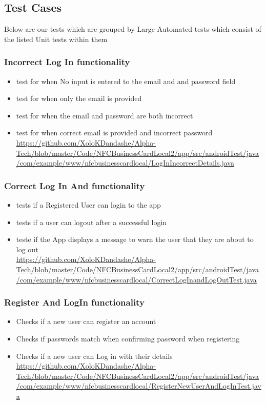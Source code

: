 \documentclass[english]{article}
\begin{document}
	\subsection {Test Cases}
	Below are our tests which are grouped by Large Automated tests which consist of the listed Unit tests within them
		\subsubsection{Incorrect Log In functionality}
		\begin{itemize} 
			\item test for when No input is entered to the email and and password field
			\item test for when only the email is provided 
			\item test for when the email and password  are both incorrect
			\item test for when correct email is provided and incorrect password
			\\
			\href{url}{https://github.com/XoloKDandashe/Alpha-Tech/blob/master/Code/NFCBusinessCardLocal2/app/src/androidTest/java/com/example/www/nfcbusinesscardlocal/LogInIncorrectDetails.java}

		\end{itemize}
		\subsubsection{Correct Log In And functionality}
		\begin{itemize} 
			\item tests if a Registered User can login to the app
			\item tests if a user can logout after a successful login
			\item teste if the App displays a message to warn the user that they are about to log out
			\\
			\href{url}{https://github.com/XoloKDandashe/Alpha-Tech/blob/master/Code/NFCBusinessCardLocal2/app/src/androidTest/java/com/example/www/nfcbusinesscardlocal/CorrectLogInandLogOutTest.java}
		\end{itemize}

		\subsubsection{Register And LogIn functionality}
		\begin{itemize} 
			\item Checks if a new user can register an account
			\item Checks if passwords match when confirming password when registering
			\item Checks if a new user can Log in with their details 
			\\
	\href{url}{https://github.com/XoloKDandashe/Alpha-Tech/blob/master/Code/NFCBusinessCardLocal2/app/src/androidTest/java/com/example/www/nfcbusinesscardlocal/RegisterNewUserAndLogInTest.java}

			
		\end{itemize}
\end{document}
